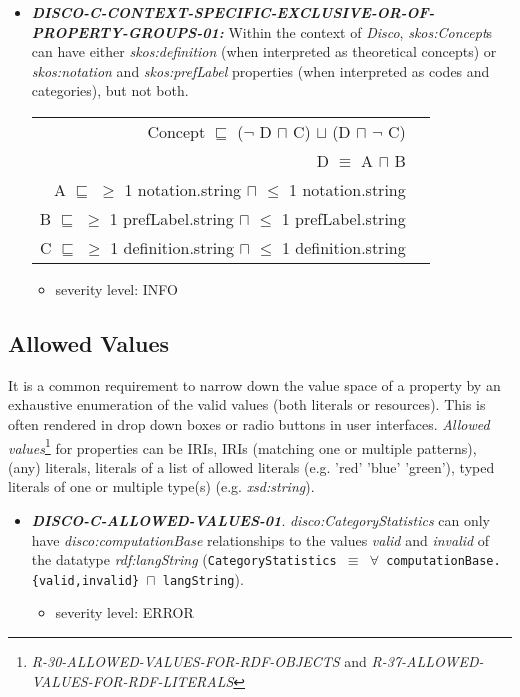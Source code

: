 \documentclass{llncs}
\newcommand{\ms}[1]{\texttt{#1}}
\newenvironment{DL}{
  \vspace{0cm}
  \begin{tabular}{r l}

}{
  \end{tabular}
}
\begin{document}
\begin{itemize}
	\item \textbf{{\em DISCO-C-CONTEXT-SPECIFIC-EXCLUSIVE-OR-OF-PROPERTY-GROUPS-01:}}
Within the context of \emph{Disco}, \emph{skos:Concept}s can have either \emph{skos:definition} (when interpreted as theoretical concepts) or \emph{skos:notation} and \emph{skos:prefLabel} properties (when interpreted as codes and categories), but not both.
\begin{DL}
Concept $\sqsubseteq$ ($\neg$ D $\sqcap$ C) $\sqcup$ (D $\sqcap$ $\neg$ C) \\ 
D $\equiv$ A $\sqcap$ B \\
A $\sqsubseteq$ $\geq$ 1 notation.string $\sqcap$ $\leq$ 1 notation.string \\
B $\sqsubseteq$ $\geq$ 1 prefLabel.string $\sqcap$ $\leq$ 1 prefLabel.string \\
C $\sqsubseteq$ $\geq$ 1 definition.string $\sqcap$ $\leq$ 1 definition.string \\
\end{DL}
\begin{itemize}
		\item severity level: INFO
	\end{itemize}
\end{itemize}

\subsection{Allowed Values}

It is a common requirement to narrow down the value space of a property by an exhaustive enumeration of the valid values (both literals or resources). 
This is often rendered in drop down boxes or radio buttons in user interfaces. 
\emph{Allowed values}\footnote{{\em R-30-ALLOWED-VALUES-FOR-RDF-OBJECTS} and 
{\em R-37-ALLOWED-VALUES-FOR-RDF-LITERALS}} for properties can be IRIs, IRIs (matching one or multiple patterns), (any) literals, literals of a list of allowed literals (e.g. 'red' 'blue' 'green'), typed literals of one or multiple type(s) (e.g. \emph{xsd:string}).

\begin{itemize}
	\item \textbf{{\em DISCO-C-ALLOWED-VALUES-01}}.
{\em disco:CategoryStatistics} can only have {\em disco:computationBase} relationships to the values \emph{valid} and \emph{invalid} of the datatype {\em rdf:langString} (\ms{CategoryStatistics $\equiv$ $\forall$ computationBase.\{valid,invalid\} $\sqcap$ langString}).
	\begin{itemize}
		\item severity level: ERROR
	\end{itemize}
\end{itemize}
\end{document}
